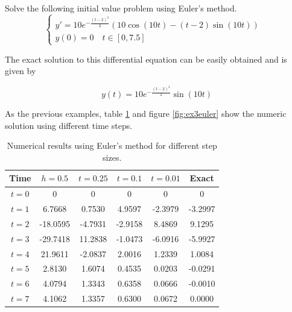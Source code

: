 \begin{exmp}
Solve the following initial value problem using Euler's method.
\begin{equation}
\begin{cases}
    y' = 10e^{-\frac{(t-2)^2}{2}}\left(10\cos(10t)-(t-2)\sin(10t)\right)&\\ y(0) = 0 \quad t\in[0,7.5]&
\end{cases}
\end{equation}
\end{exmp}

The exact solution to this differential equation can be easily obtained and is given by

\begin{equation}
    y(t) = 10e^{-\frac{(t-2)^2}{2}}\sin(10t)
\end{equation}

As the previous examples, table \ref{tab:ex3euler} and figure \ref{fig:ex3euler} show the numeric solution using different time steps.

\begin{table}[H]
\centering
\begin{tabular}{cccccc}
\hline
\textbf{Time}           & \textbf{\boldmath$h=0.5$} & \textbf{\boldmath$t=0.25$} & \textbf{\boldmath$t=0.1$} & \textbf{\boldmath$t=0.01$} & \textbf{Exact} \\ \hline
\textbf{\boldmath$t=0$} & 0                    & 0                     & 0                    & 0                    & 0        \\
\textbf{\boldmath$t=1$} & 6.7668                    & 0.7530                     & 4.9597                    & -2.3979                    & -3.2997        \\
\textbf{\boldmath$t=2$} & -18.0595                  & -4.7931                    & -2.9158                   & 8.4869                     & 9.1295         \\
\textbf{\boldmath$t=3$} & -29.7418                  & 11.2838                    & -1.0473                   & -6.0916                    & -5.9927        \\
\textbf{\boldmath$t=4$} & 21.9611                   & -2.0837                    & 2.0016                    & 1.2339                     & 1.0084         \\
\textbf{\boldmath$t=5$} & 2.8130                    & 1.6074                     & 0.4535                    & 0.0203                     & -0.0291        \\
\textbf{\boldmath$t=6$} & 4.0794                    & 1.3343                     & 0.6358                    & 0.0666                     & -0.0010        \\
\textbf{\boldmath$t=7$} & 4.1062                    & 1.3357                     & 0.6300                    & 0.0672                     & 0.0000         \\ \hline
\end{tabular}
\caption{Numerical results using Euler's method for different step sizes.}
\label{tab:ex3euler}
\end{table}

